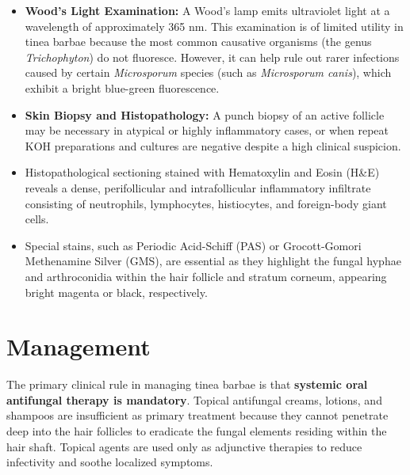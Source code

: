 \begin{itemize}
    \item \textbf{Wood's Light Examination:} A Wood's lamp emits ultraviolet light at a wavelength of approximately 365 nm. This examination is of limited utility in tinea barbae because the most common causative organisms (the genus \textit{Trichophyton}) do not fluoresce. However, it can help rule out rarer infections caused by certain \textit{Microsporum} species (such as \textit{Microsporum canis}), which exhibit a bright blue-green fluorescence.
    \item \textbf{Skin Biopsy and Histopathology:} A punch biopsy of an active follicle may be necessary in atypical or highly inflammatory cases, or when repeat KOH preparations and cultures are negative despite a high clinical suspicion.
    \item Histopathological sectioning stained with Hematoxylin and Eosin (H\&E) reveals a dense, perifollicular and intrafollicular inflammatory infiltrate consisting of neutrophils, lymphocytes, histiocytes, and foreign-body giant cells.
    \item Special stains, such as Periodic Acid-Schiff (PAS) or Grocott-Gomori Methenamine Silver (GMS), are essential as they highlight the fungal hyphae and arthroconidia within the hair follicle and stratum corneum, appearing bright magenta or black, respectively.
\end{itemize}

\section*{Management}
The primary clinical rule in managing tinea barbae is that \textbf{systemic oral antifungal therapy is mandatory}. Topical antifungal creams, lotions, and shampoos are insufficient as primary treatment because they cannot penetrate deep into the hair follicles to eradicate the fungal elements residing within the hair shaft. Topical agents are used only as adjunctive therapies to reduce infectivity and soothe localized symptoms.

